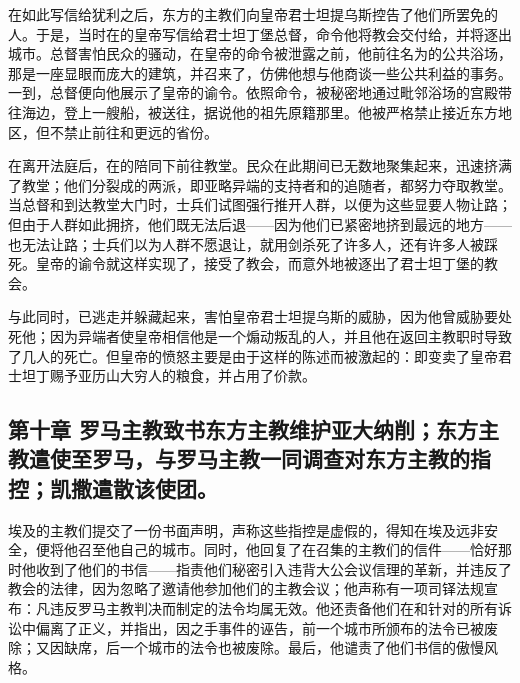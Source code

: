 在如此写信给犹利之后，东方的主教们向皇帝君士坦提乌斯控告了他们所罢免的人。于是，当时在的皇帝写信给君士坦丁堡总督，命令他将教会交付给，并将逐出城市。总督害怕民众的骚动，在皇帝的命令被泄露之前，他前往名为的公共浴场，那是一座显眼而庞大的建筑，并召来了，仿佛他想与他商谈一些公共利益的事务。一到，总督便向他展示了皇帝的谕令。依照命令，被秘密地通过毗邻浴场的宫殿带往海边，登上一艘船，被送往，据说他的祖先原籍那里。他被严格禁止接近东方地区，但不禁止前往和更远的省份。\par

在离开法庭后，在的陪同下前往教堂。民众在此期间已无数地聚集起来，迅速挤满了教堂；他们分裂成的两派，即亚略异端的支持者和的追随者，都努力夺取教堂。当总督和到达教堂大门时，士兵们试图强行推开人群，以便为这些显要人物让路；但由于人群如此拥挤，他们既无法后退——因为他们已紧密地挤到最远的地方——也无法让路；士兵们以为人群不愿退让，就用剑杀死了许多人，还有许多人被踩死。皇帝的谕令就这样实现了，接受了教会，而意外地被逐出了君士坦丁堡的教会。\par

与此同时，已逃走并躲藏起来，害怕皇帝君士坦提乌斯的威胁，因为他曾威胁要处死他；因为异端者使皇帝相信他是一个煽动叛乱的人，并且他在返回主教职时导致了几人的死亡。但皇帝的愤怒主要是由于这样的陈述而被激起的：即变卖了皇帝君士坦丁赐予亚历山大穷人的粮食，并占用了价款。\par


\subsection{第十章 罗马主教致书东方主教维护亚大纳削；东方主教遣使至罗马，与罗马主教一同调查对东方主教的指控；凯撒遣散该使团。}

埃及的主教们提交了一份书面声明，声称这些指控是虚假的，得知在埃及远非安全，便将他召至他自己的城市。同时，他回复了在召集的主教们的信件——恰好那时他收到了他们的书信——指责他们秘密引入违背大公会议信理的革新，并违反了教会的法律，因为忽略了邀请他参加他们的主教会议；他声称有一项司铎法规宣布：凡违反罗马主教判决而制定的法令均属无效。他还责备他们在和针对的所有诉讼中偏离了正义，并指出，因之手事件的诬告，前一个城市所颁布的法令已被废除；又因缺席，后一个城市的法令也被废除。最后，他谴责了他们书信的傲慢风格。\par

